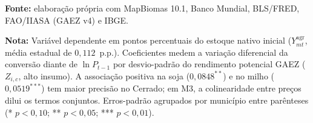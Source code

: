 \begin{table}[htbp]
\begin{minipage}{\textwidth}
\SingleSpacing
\noindent\textbf{Fonte:} elaboração própria com MapBiomas 10.1, Banco Mundial, BLS/FRED, FAO/IIASA (GAEZ v4) e IBGE.\par\medskip
\noindent\textbf{Nota:} Variável dependente em pontos percentuais do estoque nativo inicial ($Y_{mt}^{\text{agr}}$, média estadual de $0{,}112$~p.p.). Coeficientes medem a variação diferencial da conversão diante de $\ln P_{t-1}$ por desvio-padrão do rendimento potencial GAEZ ($Z_{i,c}$, alto insumo). A associação positiva na soja ($0{,}0848^{**}$) e no milho ($0{,}0519^{***}$) tem maior precisão no Cerrado; em M3, a colinearidade entre preços dilui os termos conjuntos. Erros-padrão agrupados por município entre parênteses (* $p<0{,}10$; ** $p<0{,}05$; *** $p<0{,}01$).
\end{minipage}
\end{table}
